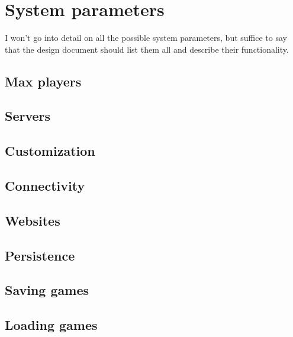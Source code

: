 \section{System parameters} %
I won't go into detail on all the possible system parameters, but suffice to say that the design document should list them all and describe their functionality.
\subsection{Max players} %

\subsection{Servers} %

\subsection{Customization} %

\subsection{Connectivity} %

\subsection{Websites} %

\subsection{Persistence} %

\subsection{Saving games} %

\subsection{Loading games} %
